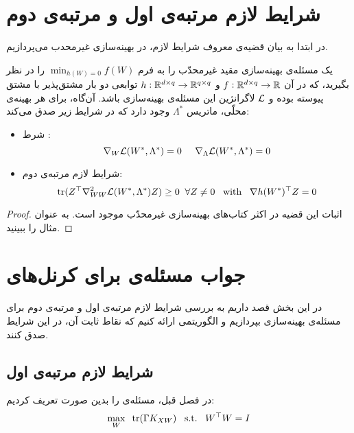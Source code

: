 \section{شرایط لازم مرتبه‌ی اول و مرتبه‌ی دوم }

در ابتدا به بیان قضیه‌ی معروف شرایط لازم، در بهینه‌سازی غیرمحدب می‌پردازیم. 
\begin{thm}
یک مسئله‌ی بهینه‌سازی مقید غیرمحدّب را به فرم
$\min_{h(W) = 0} f(W)$
را در نظر بگیرید، که در آن
$f: \mathbb{R}^{d\times q} \to \mathbb{R}$
و
$h: \mathbb{R}^{d\times q} \to \mathbb{R}^{q\times q}$
توابعی دو بار مشتق‌پذیر با مشتق پیوسته بوده و 
$\mathcal{L}$
لاگرانژین این مسئله‌ی بهینه‌سازی باشد. آن‌گاه، برای هر بهینه‌ی محلّی،  ماتریس
$\Lambda^*$
وجود دارد که  در شرایط زیر صدق می‌کند:
\begin{itemize}
\item
شرط
:
\begin{equation}
\nabla_W \mathcal{L}(W^*, \Lambda^*) =0 \;\;\;\;\;
\nabla_\Lambda \mathcal{L}(W^*, \Lambda^*) =0
\end{equation}

\item
شرایط لازم مرتبه‌ی دوم:
\begin{equation}
\mathrm{tr} (Z^\top \nabla^2_{WW} \mathcal{L} (W^*, \Lambda^*)Z) \geq 0 \;\; \forall Z\neq 0 \;\;\;  \mathrm{with} \;\;\; \nabla h(W^*)^\top Z = 0
\end{equation}
\end{itemize}
\end{thm}
\begin{proof}
	اثبات این قضیه در اکثر کتاب‌های بهینه‌سازی غیرمحدّب موجود است. به عنوان مثال 
	\cite{nocedal2006numerical}
	را ببینید.
\end{proof}

\section{جواب مسئله‌ی 
برای کرنل‌های 
}
در این بخش قصد داریم به بررسی شرایط لازم مرتبه‌ی اول و مرتبه‌ی دوم برای مسئله‌ی بهینه‌سازی
بپردازیم و الگوریتمی ارائه کنیم که نقاط ثابت آن، در این شرایط صدق کنند.
\subsection{شرایط لازم مرتبه‌ی اول}
\label{FONC}
 در فصل قبل،  مسئله‌ی 
  را بدین صورت تعریف کردیم:
\begin{equation}
\max_W \;\; \mathrm{tr}(\Gamma K_{XW})\;\;\;\mathrm{s.t.}\;\;\;W^\top W=I
\end{equation}

